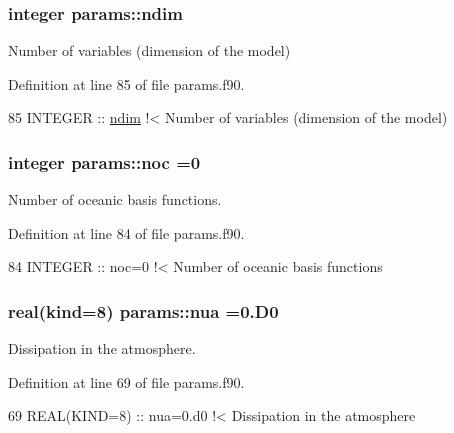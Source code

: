 \subsubsection[{\texorpdfstring{ndim}{ndim}}]{\setlength{\rightskip}{0pt plus 5cm}integer params\+::ndim}\hypertarget{namespaceparams_a2323fe1773f086e20c14f266351c482b}{}\label{namespaceparams_a2323fe1773f086e20c14f266351c482b}


Number of variables (dimension of the model) 



Definition at line 85 of file params.\+f90.


\begin{DoxyCode}
85   \textcolor{keywordtype}{INTEGER} :: \hyperlink{namespaceparams_a2323fe1773f086e20c14f266351c482b}{ndim}\textcolor{comment}{   !< Number of variables (dimension of the model)}
\end{DoxyCode}
\subsubsection[{\texorpdfstring{noc}{noc}}]{\setlength{\rightskip}{0pt plus 5cm}integer params\+::noc =0}\hypertarget{namespaceparams_acdb6ef89bcada9ba7b6b6bba575b60f4}{}\label{namespaceparams_acdb6ef89bcada9ba7b6b6bba575b60f4}


Number of oceanic basis functions. 



Definition at line 84 of file params.\+f90.


\begin{DoxyCode}
84   \textcolor{keywordtype}{INTEGER} :: noc=0\textcolor{comment}{  !< Number of oceanic basis functions}
\end{DoxyCode}
\subsubsection[{\texorpdfstring{nua}{nua}}]{\setlength{\rightskip}{0pt plus 5cm}real(kind=8) params\+::nua =0.D0}\hypertarget{namespaceparams_a8421c6937257007fb96366980677061c}{}\label{namespaceparams_a8421c6937257007fb96366980677061c}


Dissipation in the atmosphere. 



Definition at line 69 of file params.\+f90.


\begin{DoxyCode}
69   \textcolor{keywordtype}{REAL(KIND=8)} :: nua=0.d0  \textcolor{comment}{!< Dissipation in the atmosphere}
\end{DoxyCode}

